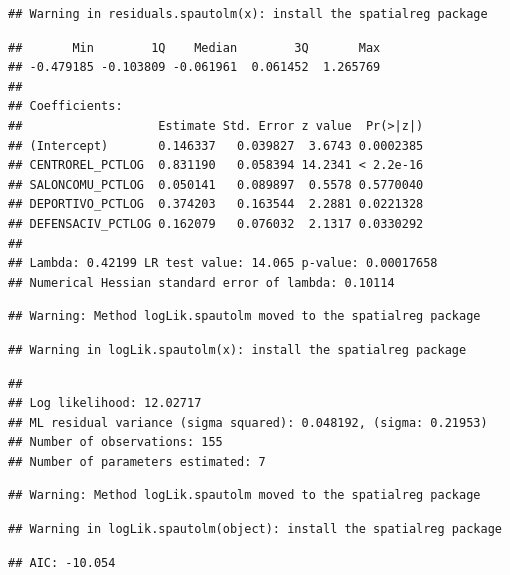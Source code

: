 \documentclass[11pt,]{article}
\newenvironment{Shaded}{\begin{snugshade}}{\end{snugshade}}
\newcommand{\KeywordTok}[1]{\textcolor[rgb]{0.13,0.29,0.53}{\textbf{#1}}}
\newcommand{\DataTypeTok}[1]{\textcolor[rgb]{0.13,0.29,0.53}{#1}}
\newcommand{\StringTok}[1]{\textcolor[rgb]{0.31,0.60,0.02}{#1}}
\newcommand{\OperatorTok}[1]{\textcolor[rgb]{0.81,0.36,0.00}{\textbf{#1}}}
\newcommand{\NormalTok}[1]{#1}
\begin{document}
\begin{verbatim}
## Warning in residuals.spautolm(x): install the spatialreg package
\end{verbatim}

\begin{verbatim}
##       Min        1Q    Median        3Q       Max 
## -0.479185 -0.103809 -0.061961  0.061452  1.265769 
## 
## Coefficients: 
##                   Estimate Std. Error z value  Pr(>|z|)
## (Intercept)       0.146337   0.039827  3.6743 0.0002385
## CENTROREL_PCTLOG  0.831190   0.058394 14.2341 < 2.2e-16
## SALONCOMU_PCTLOG  0.050141   0.089897  0.5578 0.5770040
## DEPORTIVO_PCTLOG  0.374203   0.163544  2.2881 0.0221328
## DEFENSACIV_PCTLOG 0.162079   0.076032  2.1317 0.0330292
## 
## Lambda: 0.42199 LR test value: 14.065 p-value: 0.00017658 
## Numerical Hessian standard error of lambda: 0.10114
\end{verbatim}

\begin{verbatim}
## Warning: Method logLik.spautolm moved to the spatialreg package
\end{verbatim}

\begin{verbatim}
## Warning in logLik.spautolm(x): install the spatialreg package
\end{verbatim}

\begin{verbatim}
## 
## Log likelihood: 12.02717 
## ML residual variance (sigma squared): 0.048192, (sigma: 0.21953)
## Number of observations: 155 
## Number of parameters estimated: 7
\end{verbatim}

\begin{verbatim}
## Warning: Method logLik.spautolm moved to the spatialreg package
\end{verbatim}

\begin{verbatim}
## Warning in logLik.spautolm(object): install the spatialreg package
\end{verbatim}

\begin{verbatim}
## AIC: -10.054
\end{verbatim}

\begin{Shaded}
\end{Shaded}
\end{document}
